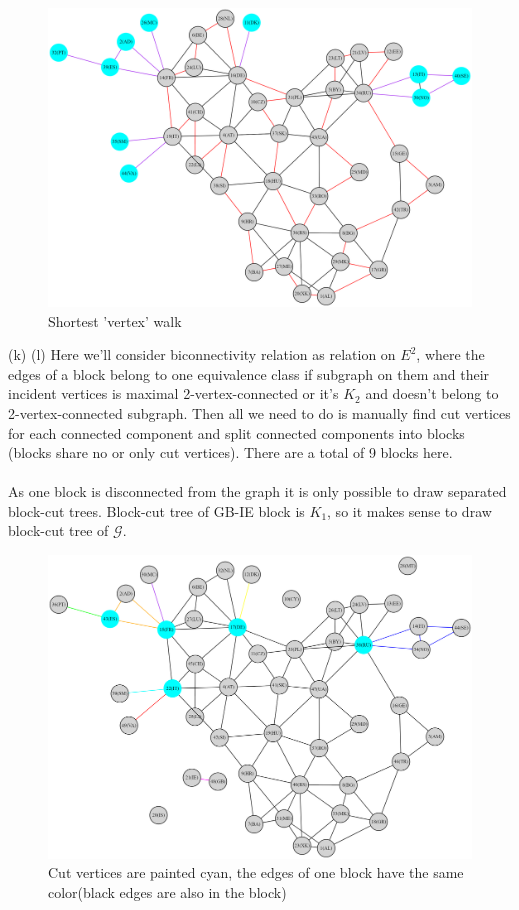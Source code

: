 \documentclass{article}
\begin{document}
	\begin{figure}[h]
		\centering
		\includegraphics[width=1\textwidth]{v_walk.png}
		\caption{Shortest 'vertex' walk}
	\end{figure}\newpage
	(k)\newpage
	(l) Here we'll consider biconnectivity relation as relation on $E^2$, where the edges of a block belong to one equivalence class if subgraph on them and their incident vertices is maximal 2-vertex-connected or it's $K_2$ and doesn't belong to 2-vertex-connected subgraph. Then all we need to do is manually find cut vertices for each connected component and split connected components into blocks (blocks share no or only cut vertices). There are a total of 9 blocks here. \\\\
	As one block is disconnected from the graph it is only possible to draw separated block-cut trees. Block-cut tree of GB-IE block is $K_1$, so it makes sense to draw block-cut tree of $\mathcal{G}$.
	\begin{figure}[h]
		\centering
		\includegraphics[width=1\textwidth]{blocks.png}
		\caption{Cut vertices are painted cyan, the edges of one block have the same color(black edges are also in the block)}
	\end{figure}
\end{document}
